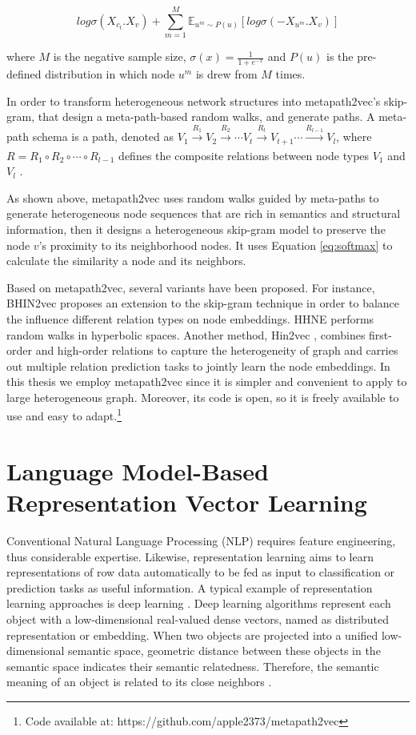 \begin{equation}
    log\sigma(X_{c_{t}}.X_{v}) + \sum_{m=1}^{M} \mathbb{E}_{u^{m}\sim P(u)}[log\sigma(-X_{u^{m}}.X_{v})]
\end{equation}

where $M$ is the negative sample size, $\sigma (x) = \frac{1}{1+e^{-x}}$ and $P(u)$ is the pre-defined distribution in which node $u^{m}$ is drew from $M$ times.

In order to transform heterogeneous network structures into metapath2vec's skip-gram, that design a meta-path-based random walks, and generate paths. A meta-path schema is a path, denoted as $V_{1} \xrightarrow[]{R_{1}} V_{2} \xrightarrow[]{R_{2}}\cdots V_{t} \xrightarrow[]{R_{t}} V_{t+1} \cdots \xrightarrow[]{R_{l-1}} V_{l}$, where $R = R_{1} \circ R_{2} \circ \cdots \circ R_{l-1}$ defines the composite relations between node types $V_{1}$ and $V_{l}$ \cite{sun2012mining}.

As shown above, metapath2vec uses random walks guided by meta-paths to generate heterogeneous node sequences that are rich in semantics and structural information, then it designs a heterogeneous skip-gram model to preserve the node $v$'s proximity to its neighborhood nodes. It uses Equation \ref{eq:softmax} to calculate the similarity a node and its neighbors.

Based on metapath2vec, several variants have been proposed. For instance, BHIN2vec \cite{lee2019bhin2vec} proposes an extension to the skip-gram technique in order to balance the influence different relation types on node embeddings. HHNE \cite{wang2019hyperbolic} performs random walks in hyperbolic spaces. Another method, Hin2vec \cite{fu2017hin2vec}, combines first-order and high-order relations to capture the heterogeneity of graph and carries out multiple relation prediction tasks to jointly learn the node embeddings. In this thesis we employ metapath2vec since it is simpler and convenient to apply to large heterogeneous graph. Moreover, its code is open, so it is freely available to use and easy to adapt.\footnote{Code available at: https://github.com/apple2373/metapath2vec}

\section{Language Model-Based Representation Vector Learning}
Conventional Natural Language Processing (NLP) requires feature engineering, thus considerable expertise. Likewise, representation learning aims to learn representations of row data automatically to be fed as input to classification or prediction tasks as useful information. A typical example of representation learning approaches is deep learning \cite{goodfellow2016deep}. Deep learning algorithms represent each object with a low-dimensional real-valued dense vectors, named as distributed representation or embedding. When two objects are projected into a unified low-dimensional semantic space, geometric distance between these objects in the semantic space indicates their semantic relatedness. Therefore, the semantic meaning of an object is related to its close neighbors \cite{liu2020representation}.  

